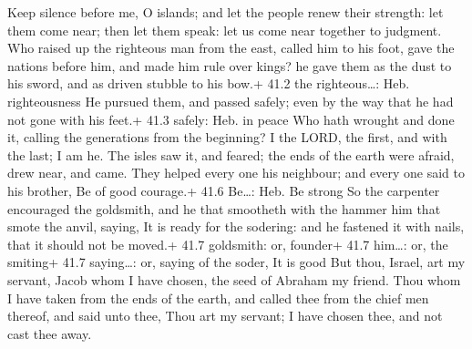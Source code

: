  Keep silence before me, O islands; and let the people renew
their strength: let them come near; then let them speak: let us come
near together to judgment.  Who raised up the righteous man
from the east, called him to his foot, gave the nations before him, and
made him rule over kings? he gave them as the dust to his sword, and as
driven stubble to his bow.+ 41.2 the righteous\ldots: Heb. righteousness
 He pursued them, and passed safely; even by the way that he
had not gone with his feet.+ 41.3 safely: Heb. in peace  Who
hath wrought and done it, calling the generations from the beginning? I
the LORD, the first, and with the last; I am he.  The isles
saw it, and feared; the ends of the earth were afraid, drew near, and
came.  They helped every one his neighbour; and every one
said to his brother, Be of good courage.+ 41.6 Be\ldots: Heb. Be strong
 So the carpenter encouraged the goldsmith, and he that
smootheth with the hammer him that smote the anvil, saying, It is ready
for the sodering: and he fastened it with nails, that it should not be
moved.+ 41.7 goldsmith: or, founder+ 41.7 him\ldots: or, the smiting+
41.7 saying\ldots: or, saying of the soder, It is good  But
thou, Israel, art my servant, Jacob whom I have chosen, the seed of
Abraham my friend.  Thou whom I have taken from the ends of
the earth, and called thee from the chief men thereof, and said unto
thee, Thou art my servant; I have chosen thee, and not cast thee away.

